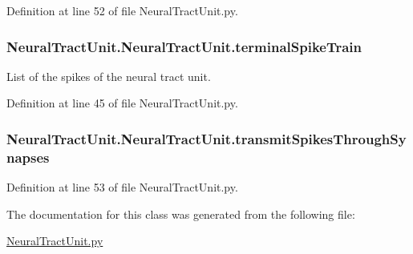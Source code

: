 Definition at line 52 of file Neural\+Tract\+Unit.\+py.

\subsubsection[{\texorpdfstring{terminal\+Spike\+Train}{terminalSpikeTrain}}]{\setlength{\rightskip}{0pt plus 5cm}Neural\+Tract\+Unit.\+Neural\+Tract\+Unit.\+terminal\+Spike\+Train}\hypertarget{class_neural_tract_unit_1_1_neural_tract_unit_ac34c86235329e753e8cfdfcc1e24c53f}{}\label{class_neural_tract_unit_1_1_neural_tract_unit_ac34c86235329e753e8cfdfcc1e24c53f}


List of the spikes of the neural tract unit. 



Definition at line 45 of file Neural\+Tract\+Unit.\+py.

\subsubsection[{\texorpdfstring{transmit\+Spikes\+Through\+Synapses}{transmitSpikesThroughSynapses}}]{\setlength{\rightskip}{0pt plus 5cm}Neural\+Tract\+Unit.\+Neural\+Tract\+Unit.\+transmit\+Spikes\+Through\+Synapses}\hypertarget{class_neural_tract_unit_1_1_neural_tract_unit_ac6fa367f6ada8045919674feaed4f6ad}{}\label{class_neural_tract_unit_1_1_neural_tract_unit_ac6fa367f6ada8045919674feaed4f6ad}


Definition at line 53 of file Neural\+Tract\+Unit.\+py.



The documentation for this class was generated from the following file\+:\begin{DoxyCompactItemize}
\item 
\hyperlink{_neural_tract_unit_8py}{Neural\+Tract\+Unit.\+py}\end{DoxyCompactItemize}
